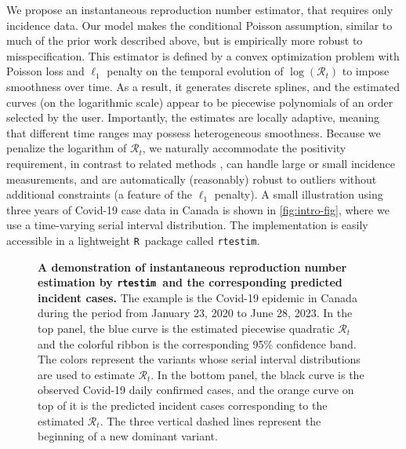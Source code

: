 \documentclass[10pt,letterpaper]{article}
\newcommand{\R}{\texttt{R}}
\def\RtEstim{\texttt{rtestim}}
\def\calR{\mathcal{R}}
\begin{document}
We propose an instantaneous reproduction number estimator, that
requires only incidence data. Our model makes the conditional Poisson
assumption, similar to much of the prior work described above, but is
empirically more robust to misspecification. This estimator is defined by a
convex optimization problem with Poisson loss and $\ell_1$ penalty on the
temporal evolution of $\log(\calR_t)$ to impose smoothness over time. As a
result, it generates discrete splines, and the estimated curves (on the
logarithmic scale) appear to be piecewise polynomials of an order selected by
the user. Importantly, the estimates are locally adaptive, meaning that
different time ranges may possess heterogeneous smoothness. Because we penalize
the logarithm of $\calR_t$, we naturally accommodate the positivity requirement,
in contrast to related methods \cite{abry2020spatial,pascal2022nonsmooth}, can
handle large or small incidence measurements, and are automatically (reasonably)
robust to outliers without additional constraints (a feature of the $\ell_1$
penalty). A small illustration using three years of Covid-19 case data in Canada
\cite{CovidTimelineCanada} is shown in \autoref{fig:intro-fig}, where we
use a time-varying serial interval distribution. The implementation is easily
accessible in a lightweight \R\ package called \texttt{rtestim}.
\begin{figure}[!t]
  \centering
  \caption{{\bf A demonstration of instantaneous reproduction number estimation by
  \RtEstim\ and the corresponding predicted incident cases.} The example is the Covid-19
  epidemic in Canada during the period from January 23, 2020 to June 28, 2023.
  In the top panel, the blue curve is the estimated piecewise quadratic
  $\calR_t$ and the colorful ribbon is the corresponding 95\% confidence band.
  The colors represent the variants whose serial interval distributions are used
  to estimate $\calR_t$. 
  In the bottom panel, the black curve is the observed Covid-19
  daily confirmed cases, and the orange curve on top of it is the predicted
  incident cases corresponding to the estimated $\calR_t$. The three vertical
  dashed lines represent the beginning of a new dominant variant.}
  \label{fig:intro-fig}
\end{figure}
\end{document}
